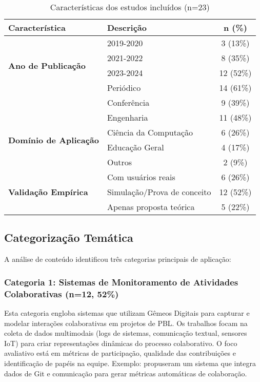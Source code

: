 \documentclass[english, spanish, brazilian]{RBIEarticle} %
\begin{document}
\begin{table}[htbp]
\centering
\caption{Características dos estudos incluídos (n=23)}
\label{tab:characteristics}
\begin{tabularx}{\textwidth}{lXc}
\toprule
\textbf{Característica} & \textbf{Descrição} & \textbf{n (\%)} \\
\midrule
\multirow{4}{*}{\textbf{Ano de Publicação}}
& 2019-2020 & 3 (13\%) \\
& 2021-2022 & 8 (35\%) \\
& 2023-2024 & 12 (52\%) \\
\cmidrule{2-3}
\multirow{3}{*}{\textbf{Tipo de Publicação}}
& Periódico & 14 (61\%) \\
& Conferência & 9 (39\%) \\
\cmidrule{2-3}
\multirow{4}{*}{\textbf{Domínio de Aplicação}}
& Engenharia & 11 (48\%) \\
& Ciência da Computação & 6 (26\%) \\
& Educação Geral & 4 (17\%) \\
& Outros & 2 (9\%) \\
\cmidrule{2-3}
\multirow{3}{*}{\textbf{Validação Empírica}}
& Com usuários reais & 6 (26\%) \\
& Simulação/Prova de conceito & 12 (52\%) \\
& Apenas proposta teórica & 5 (22\%) \\
\bottomrule
\end{tabularx}
\end{table}

\subsection{Categorização Temática}

A análise de conteúdo identificou três categorias principais de aplicação:

\subsubsection{Categoria 1: Sistemas de Monitoramento de Atividades Colaborativas (n=12, 52\%)}

Esta categoria engloba sistemas que utilizam Gêmeos Digitais para capturar e modelar interações colaborativas em projetos de PBL. Os trabalhos focam na coleta de dados multimodais (logs de sistemas, comunicação textual, sensores IoT) para criar representações dinâmicas do processo colaborativo. O foco avaliativo está em métricas de participação, qualidade das contribuições e identificação de papéis na equipe. Exemplo: \textcite{Rodriguez2023} propuseram um sistema que integra dados de Git e comunicação para gerar métricas automáticas de colaboração.
\end{document}
